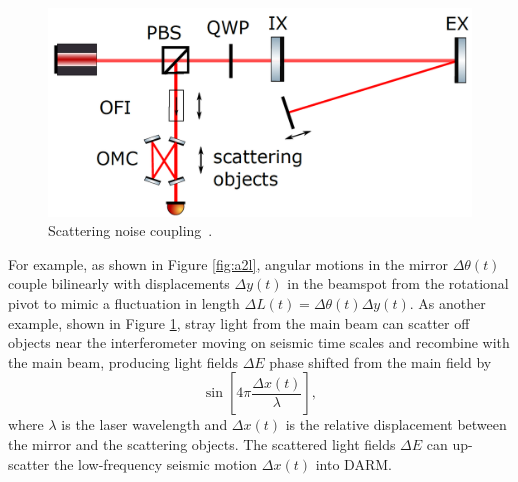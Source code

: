 \begin{refsection}
\begin{figure}[htbp]
   \centering
   \includegraphics[width=0.6\columnwidth]{chapter_noise_sub/etc/scattering}
   \caption{Scattering noise coupling~\cite{Martynov:15}.} 
   \label{fig:scattering}
\end{figure}




For example, as shown in Figure 
\ref{fig:a2l}, 
angular motions in the mirror $\Delta \theta (t)$ couple bilinearly with displacements $\Delta y (t)$ in the beamspot from the rotational pivot to mimic a fluctuation in length $\Delta L (t)=\Delta\theta(t) \Delta y(t)$. As another example, shown in 
Figure \ref{fig:scattering}, 
stray light from the main beam can scatter off objects near the interferometer moving on seismic time scales and recombine with the main beam, producing light fields $\Delta E$ phase shifted from the main field by 
\begin{equation}
\sin \left[4\pi \frac{\Delta x(t)}{\lambda} \right],
\end{equation}
where $\lambda$ is the laser wavelength and $\Delta x(t)$ is the relative displacement between the mirror and the scattering objects. The scattered light fields $\Delta E$ can up-scatter the low-frequency seismic motion $\Delta x(t)$ into DARM. 


\end{refsection}
